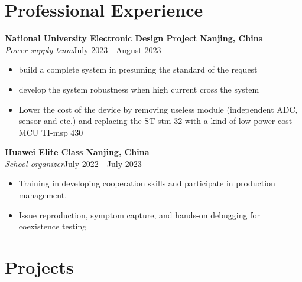 \documentclass[letterpaper,11pt]{article}
\begin{document}
\vspace{2pt}


\vspace{-6pt}
\section{\textbf{Professional Experience}}
{\bf National University Electronic Design Project}  \hfill{\textbf{Nanjing, China} }\\
\textit{Power supply team}\hfill{July 2023 - August 2023}\\

\begin{itemize}
    \item build a complete system in presuming the standard of the request
    \item develop the system robustness when high current cross the system
    \item Lower the cost of the device by removing useless module (independent ADC, sensor and etc.) and replacing the ST-stm 32 with a kind of low power cost MCU TI-msp 430

    
\end{itemize}
\vspace{2pt}
{\bf Huawei Elite Class}  \hfill{\textbf{Nanjing, China} }\\
\textit{School organizer}\hfill{July 2022 - July 2023}\\

\begin{itemize}
    \item Training in developing cooperation skills and participate in production management.
    \item Issue reproduction, symptom capture, and hands-on debugging for coexistence testing


    
\end{itemize}

\vspace{-9pt}





\section{\textbf{Projects}}
\end{document}
